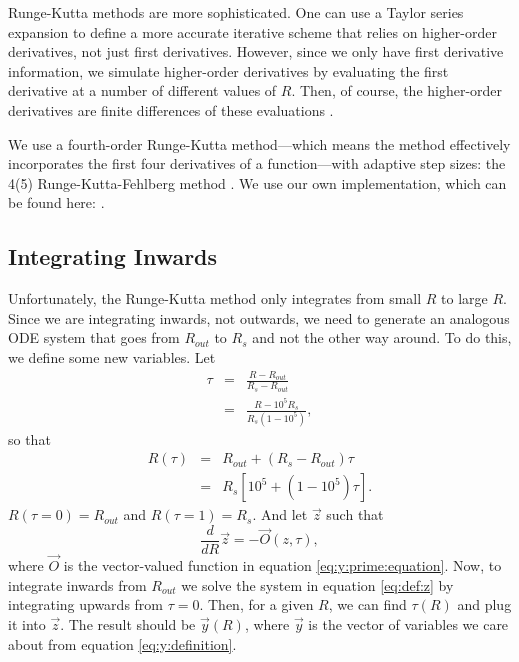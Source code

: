 \documentclass[]{article}
\newcommand{\myvec}[1]{\vec{#1}} %
\newcommand{\ddR}{\frac{d}{dR}}
\begin{document}
Runge-Kutta methods are more sophisticated. One can use a Taylor
series expansion to define a more accurate iterative scheme that
relies on higher-order derivatives, not just first
derivatives. However, since we only have first derivative information,
we simulate higher-order derivatives by evaluating the first
derivative at a number of different values of $R$. Then, of course,
the higher-order derivatives are finite differences of these
evaluations \cite{NumericalRecipes,Heath}.

We use a fourth-order Runge-Kutta method---which means the method
effectively incorporates the first four derivatives of a
function---with adaptive step sizes: the 4(5) Runge-Kutta-Fehlberg
method \cite{Fehlberg}. We use our own implementation, which can be
found here: \cite{RKF45}.

\subsection{Integrating Inwards}
\label{subsec:integrating:inwards}

Unfortunately, the Runge-Kutta method only integrates from small $R$
to large $R$. Since we are integrating inwards, not outwards, we need
to generate an analogous ODE system that goes from $R_{out}$ to $R_s$
and not the other way around. To do this, we define some new
variables. Let
\begin{eqnarray}
  \label{eq:def:tau}
  \tau &=& \frac{R-R_{out}}{R_s - R_{out}}\\
  &=& \frac{R-10^5 R_s}{R_s(1 - 10^5)},
\end{eqnarray}
so that 
\begin{eqnarray}
  \label{eq:r:of:tau}
  R(\tau) &=& R_{out} + (R_s - R_{out}) \tau\\
  &=& R_s\left[10^5 + (1 - 10^5)\tau\right].
\end{eqnarray}
$R(\tau=0)=R_{out}$ and $R(\tau=1)=R_s$. And let $\myvec{z}$ such that
\begin{equation}
  \label{eq:def:z}
  \ddR\myvec{z} = - \myvec{O}(z,\tau),
\end{equation}
where $\myvec{O}$ is the vector-valued function in equation
\eqref{eq:y:prime:equation}. Now, to integrate inwards from $R_{out}$
we solve the system in equation \eqref{eq:def:z} by integrating
upwards from $\tau=0$. Then, for a given $R$, we can find $\tau(R)$ and
plug it into $\myvec{z}$. The result should be $\myvec{y}(R)$, where
$\myvec{y}$ is the vector of variables we care about from equation
\eqref{eq:y:definition}.
\end{document}
